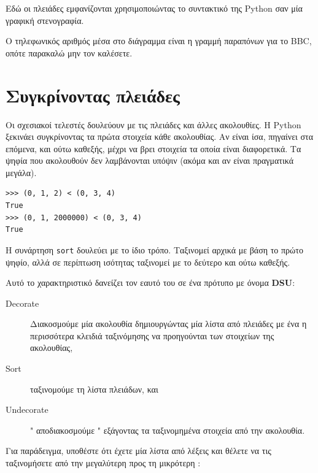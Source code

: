 \documentclass[10pt]{book}
\begin{document}
 Εδώ οι πλειάδες εμφανίζονται χρησιμοποιώντας το συντακτικό της  Python  σαν μία γραφική στενογραφία.

Ο τηλεφωνικός αριθμός μέσα στο διάγραμμα είναι η γραμμή παραπόνων για το  BBC,  οπότε παρακαλώ μην τον καλέσετε.


\section{Συγκρίνοντας πλειάδες}

Οι σχεσιακοί τελεστές δουλεύουν με τις πλειάδες και άλλες ακολουθίες. Η  Python  ξεκινάει συγκρίνοντας τα πρώτα στοιχεία  κάθε ακολουθίας. Αν είναι ίσα, πηγαίνει στα επόμενα, και ούτω καθεξής, μέχρι να βρει στοιχεία τα οποία είναι διαφορετικά. Τα ψηφία που ακολουθούν δεν λαμβάνονται υπόψιν (ακόμα και αν είναι πραγματικά μεγάλα).

 
\begin{verbatim}
>>> (0, 1, 2) < (0, 3, 4)
True
>>> (0, 1, 2000000) < (0, 3, 4)
True
\end{verbatim}
%
 Η συνάρτηση  {\tt sort}  δουλεύει με το ίδιο τρόπο. Ταξινομεί αρχικά με βάση το πρώτο ψηφίο, αλλά σε περίπτωση ισότητας ταξινομεί με το δεύτερο και ούτω καθεξής.

Αυτό το χαρακτηριστικό δανείζει τον εαυτό του σε ένα πρότυπο με όνομα  {\bf DSU}:

\begin{description}

\item[Decorate]   Διακοσμούμε μία ακολουθία δημιουργώντας μία λίστα από πλειάδες με ένα η περισσότερα κλειδιά ταξινόμησης να προηγούνται των στοιχείων της ακολουθίας, 

\item[Sort]  ταξινομούμε τη λίστα πλειάδων, και 

\item[Undecorate] " αποδιακοσμούμε "  εξάγοντας τα ταξινομημένα στοιχεία από την ακολουθία. 

\end{description}

\label{DSU}

 Για παράδειγμα, υποθέστε ότι έχετε μία λίστα από λέξεις και θέλετε να τις ταξινομήσετε από την μεγαλύτερη προς τη μικρότερη :
\end{document}
